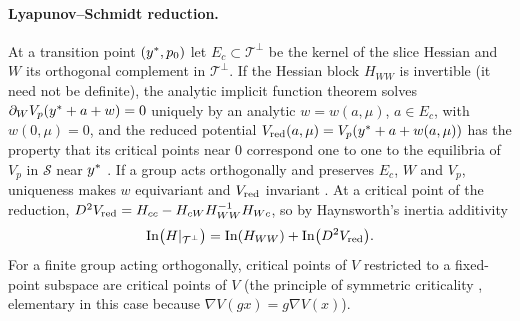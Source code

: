 \paragraph{Lyapunov--Schmidt reduction.} At a transition point $(y^{*},p_0)$ let $E_c\subset\mathcal T^\perp$ be the
kernel of the slice Hessian and $W$ its orthogonal complement in $\mathcal T^\perp$. If the Hessian block $H_{WW}$ is
invertible (it need not be definite), the analytic implicit function theorem \citep{KrantzParks2013} solves
$\partial_W V_p(y^{*}+a+w)=0$ uniquely by an analytic $w=w(a,\mu)$, $a\in E_c$, with $w(0,\mu)=0$, and the reduced
potential $V_{\mathrm{red}}(a,\mu)=V_p(y^{*}+a+w(a,\mu))$ has the property that its critical points near $0$ correspond one to
one to the equilibria of $V_p$ in $\mathcal S$ near $y^{*}$
\citep{GolubitskySchaeffer1985,Kielhoefer2012}. If a group acts orthogonally and preserves $E_c$, $W$ and $V_p$,
uniqueness makes $w$ equivariant and $V_{\mathrm{red}}$ invariant \citep{GolubitskyStewartSchaeffer1988}. At a critical point of
the reduction, $D^2V_{\mathrm{red}}=H_{cc}-H_{cW}H_{WW}^{-1}H_{Wc}$, so by Haynsworth's inertia additivity \citep{Haynsworth1968}
\begin{equation}\label{eq:haynsworth}
\operatorname{In}\bigl(H|_{\mathcal T^\perp}\bigr)=\operatorname{In}(H_{WW})+\operatorname{In}\bigl(D^2V_{\mathrm{red}}\bigr).
\end{equation}
For a finite group acting orthogonally, critical points of $V$ restricted to a fixed-point subspace are critical
points of $V$ (the principle of symmetric criticality \citep{Palais1979}, elementary in this case because
$\nabla V(gx)=g\nabla V(x)$).
